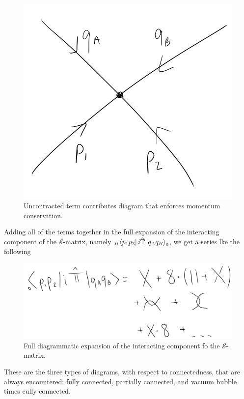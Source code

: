 \begin{figure}[H]
	\centering
	\includegraphics[scale=0.3]{momcons.png}
	\caption{Uncontracted term contributes diagram that enforces momentum conservation.}
\end{figure}

\noindent Adding all of the terms together in the full expansion of the interacting component of the $\mathcal{S}$-matrix, namely $\,_0\bra{p_1 p_2} i\hat{\mathbb{T}} \ket{q_A q_B}_0$, we get a series lke the following

\begin{figure}[H]
	\centering
	\includegraphics[scale=0.4]{tmatrix.png}
	\caption{Full diagrammatic expansion of the interacting component fo the $\mathcal{S}$-matrix.}
\end{figure}

\noindent These are the three types of diagrams, with respect to connectedness, that are always encountered: fully connected, partially connected, and vacuum bubble times cully connected.

